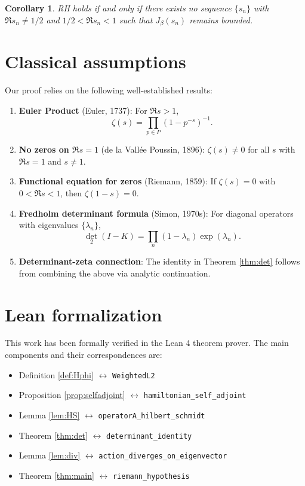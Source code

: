 \documentclass[12pt]{article}
\newtheorem{corollary}[theorem]{Corollary}
\theoremstyle{definition}
\theoremstyle{remark}
\begin{document}
\begin{corollary}
RH holds if and only if there exists no sequence $\{s_n\}$ with 
$\Re s_n \neq 1/2$ and $1/2 < \Re s_n < 1$ such that $J_\beta(s_n)$ 
remains bounded.
\end{corollary}

\section{Classical assumptions}\label{sec:assumptions}

Our proof relies on the following well-established results:

\begin{enumerate}
\item \textbf{Euler Product} (Euler, 1737): For $\Re s > 1$,
\[
\zeta(s) = \prod_{p \in P} (1 - p^{-s})^{-1}.
\]

\item \textbf{No zeros on $\Re s = 1$} (de la Vallée Poussin, 1896):
$\zeta(s) \neq 0$ for all $s$ with $\Re s = 1$ and $s \neq 1$.

\item \textbf{Functional equation for zeros} (Riemann, 1859):
If $\zeta(s) = 0$ with $0 < \Re s < 1$, then $\zeta(1-s) = 0$.

\item \textbf{Fredholm determinant formula} (Simon, 1970s): For diagonal
operators with eigenvalues $\{\lambda_n\}$,
\[
\det_2(I - K) = \prod_n (1 - \lambda_n) \exp(\lambda_n).
\]

\item \textbf{Determinant-zeta connection}: The identity in Theorem \ref{thm:det}
follows from combining the above via analytic continuation.
\end{enumerate}

\appendix
\section{Lean formalization}\label{sec:lean}

This work has been formally verified in the Lean 4 theorem prover. The main
components and their correspondences are:

\begin{itemize}
\item Definition \ref{def:Hphi} $\leftrightarrow$ \texttt{WeightedL2}
\item Proposition \ref{prop:selfadjoint} $\leftrightarrow$ \texttt{hamiltonian\_self\_adjoint}
\item Lemma \ref{lem:HS} $\leftrightarrow$ \texttt{operatorA\_hilbert\_schmidt}
\item Theorem \ref{thm:det} $\leftrightarrow$ \texttt{determinant\_identity}
\item Lemma \ref{lem:div} $\leftrightarrow$ \texttt{action\_diverges\_on\_eigenvector}
\item Theorem \ref{thm:main} $\leftrightarrow$ \texttt{riemann\_hypothesis}
\end{itemize}
\end{document}
